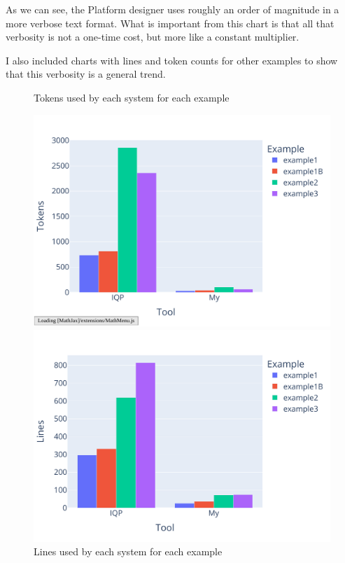 \documentclass[12pt]{report}
\begin{document}
As we can see, the Platform designer uses roughly an order of magnitude in a more verbose text format. What is important from this chart is that all that verbosity is not a one-time cost, but more like a constant multiplier.  
\par 
I also included charts with lines and token counts for other examples to show that this verbosity is a general trend. 
\begin{figure}[H] 
\begin{minipage}{.45\textwidth} 
   \caption{Tokens used by each system for each example} 
   \includegraphics[width=\textwidth]{charts/all_tokens.pdf} 
   \centering 
\end{minipage}%
\hspace{0.5cm} 
\begin{minipage}{.45\textwidth} 
   \caption{Lines used by each system for each example} 
   \includegraphics[width=\textwidth]{charts/all_lines.pdf} 
   \centering 
\end{minipage} 
\end{figure} 
\end{document}
